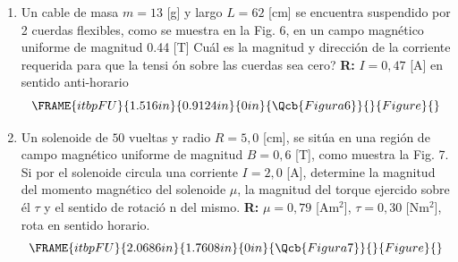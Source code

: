 \documentclass[12pt]{article}
\begin{document}
\begin{enumerate}
\item Un cable de masa $m=13$ [g] y largo $L=62$ [cm] se encuentra
suspendido por 2 cuerdas flexibles, como se muestra en la Fig. 6, en un
campo magn\'{e}tico uniforme de magnitud 0.44 [T] \textquestiondown Cu\'{a}l
es la magnitud y direcci\'{o}n de la corriente requerida para que la tensi%
\'{o}n sobre las cuerdas sea cero? \textbf{R: }$I=0,47$ [A] en sentido
anti-horario 
\begin{equation*}
\FRAME{itbpFU}{1.516in}{0.9124in}{0in}{\Qcb{Figura 6}}{}{Figure}{\special%
{language "Scientific Word";type "GRAPHIC";maintain-aspect-ratio
TRUE;display "USEDEF";valid_file "T";width 1.516in;height 0.9124in;depth
0in;original-width 3.0398in;original-height 1.8196in;cropleft "0";croptop
"1";cropright "1";cropbottom "0";tempfilename
'R2D0SD05.wmf';tempfile-properties "XPR";}}
\end{equation*}

\item Un solenoide de $50$ vueltas y radio $R=5,0$ [cm], se sit\'{u}a en una
regi\'{o}n de campo magn\'{e}tico uniforme de magnitud $B=0,6$ [T], como
muestra la Fig. 7. Si por el solenoide circula una corriente $I=2,0$ [A],
determine la magnitud del momento magn\'{e}tico del solenoide $\mu $, la
magnitud del torque ejercido sobre \'{e}l $\tau $ y el sentido de rotaci\'{o}%
n del mismo. \textbf{R: }$\mu =0,79$ [Am$^{2}$], $\tau =0,30$ [Nm$^{2}$],
rota en sentido horario. 
\begin{equation*}
\FRAME{itbpFU}{2.0686in}{1.7608in}{0in}{\Qcb{Figura 7}}{}{Figure}{\special%
{language "Scientific Word";type "GRAPHIC";maintain-aspect-ratio
TRUE;display "USEDEF";valid_file "T";width 2.0686in;height 1.7608in;depth
0in;original-width 2.3748in;original-height 2.0176in;cropleft "0";croptop
"1";cropright "1";cropbottom "0";tempfilename
'R2PVIR00.wmf';tempfile-properties "XPR";}}
\end{equation*}
\end{enumerate}
\end{document}
